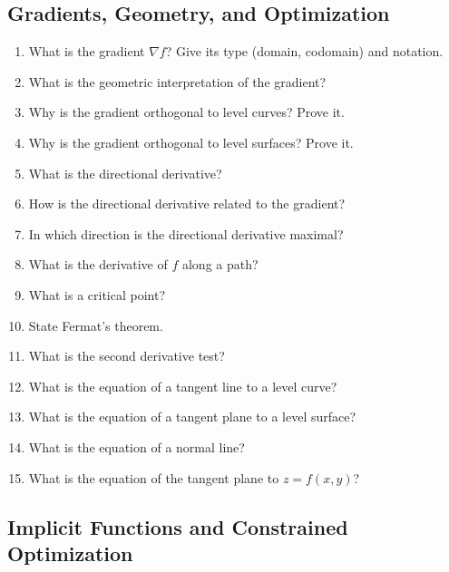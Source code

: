 \subsection{Gradients, Geometry, and Optimization}

\begin{enumerate}[resume]
  \item What is the gradient \(\nabla f\)? Give its type (domain, codomain) and notation.
  \item What is the geometric interpretation of the gradient?
  \item Why is the gradient orthogonal to level curves? Prove it.
  \item Why is the gradient orthogonal to level surfaces? Prove it.
  \item What is the directional derivative?
  \item How is the directional derivative related to the gradient?
  \item In which direction is the directional derivative maximal?
  \item What is the derivative of \(f\) along a path?
  \item What is a critical point?
  \item State Fermat's theorem.
  \item What is the second derivative test?
  \item What is the equation of a tangent line to a level curve?
  \item What is the equation of a tangent plane to a level surface?
  \item What is the equation of a normal line?
  \item What is the equation of the tangent plane to \(z=f(x,y)\)?
\end{enumerate}

\subsection{Implicit Functions and Constrained Optimization}

